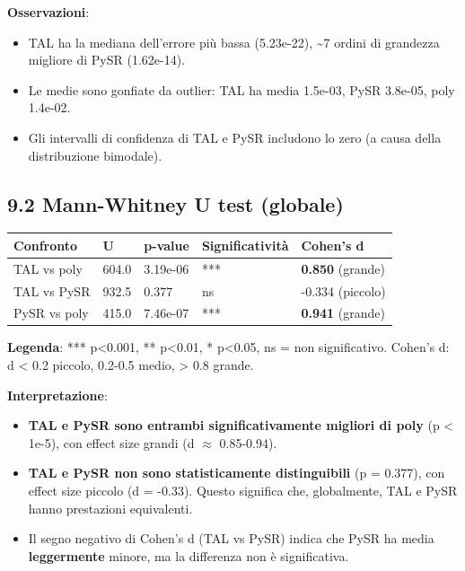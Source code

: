 \documentclass[
]{article}
\providecommand{\tightlist}{%
  \setlength{\itemsep}{0pt}\setlength{\parskip}{0pt}}
\begin{document}
\textbf{Osservazioni}:

\begin{itemize}
\tightlist
\item
  TAL ha la mediana dell'errore più bassa (5.23e-22), \textasciitilde7
  ordini di grandezza migliore di PySR (1.62e-14).
\item
  Le medie sono gonfiate da outlier: TAL ha media 1.5e-03, PySR 3.8e-05,
  poly 1.4e-02.
\item
  Gli intervalli di confidenza di TAL e PySR includono lo zero (a causa
  della distribuzione bimodale).
\end{itemize}

\subsection{9.2 Mann-Whitney U test
(globale)}\label{mann-whitney-u-test-globale}

\begin{longtable}[]{@{}lllll@{}}
\toprule\noalign{}
Confronto & U & p-value & Significatività & Cohen's d \\
\midrule\noalign{}
\endhead
\bottomrule\noalign{}
\endlastfoot
TAL vs poly & 604.0 & 3.19e-06 & *** & \textbf{0.850} (grande) \\
TAL vs PySR & 932.5 & 0.377 & ns & -0.334 (piccolo) \\
PySR vs poly & 415.0 & 7.46e-07 & *** & \textbf{0.941} (grande) \\
\end{longtable}

\textbf{Legenda}: *** p\textless0.001, ** p\textless0.01, *
p\textless0.05, ns = non significativo. Cohen's d: \textbar d\textbar{}
\textless{} 0.2 piccolo, 0.2-0.5 medio, \textgreater{} 0.8 grande.

\textbf{Interpretazione}:

\begin{itemize}
\tightlist
\item
  \textbf{TAL e PySR sono entrambi significativamente migliori di poly}
  (p \textless{} 1e-5), con effect size grandi (d $\approx$ 0.85-0.94).
\item
  \textbf{TAL e PySR non sono statisticamente distinguibili} (p =
  0.377), con effect size piccolo (d = -0.33). Questo significa che,
  globalmente, TAL e PySR hanno prestazioni equivalenti.
\item
  Il segno negativo di Cohen's d (TAL vs PySR) indica che PySR ha media
  \textbf{leggermente} minore, ma la differenza non è significativa.
\end{itemize}
\end{document}
